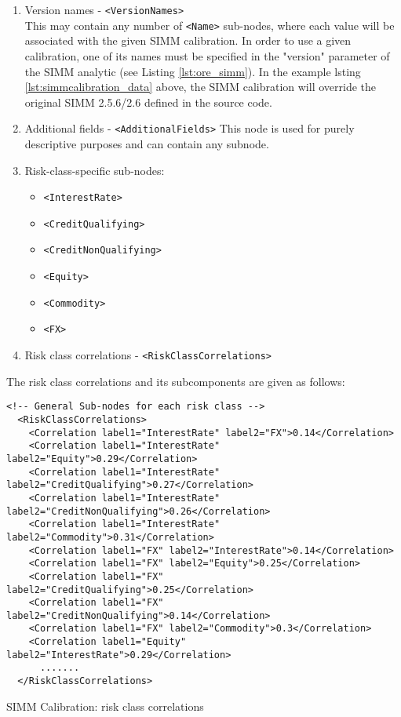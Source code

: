 \begin{enumerate}
  \item Version names - {\tt <VersionNames>} \\
    This may contain any number of {\tt <Name>} sub-nodes, where each value will be associated with the given SIMM
    calibration. In order to use a given calibration, one of its names must be specified in the "version" parameter of the
    SIMM analytic (see Listing \ref{lst:ore_simm}). In the example lsting \ref{lst:simmcalibration_data} above, the SIMM
    calibration will override the original SIMM 2.5.6/2.6 defined in the source code.
  \item Additional fields - {\tt <AdditionalFields>}
    This node is used for purely descriptive purposes and can contain any subnode.
  \item Risk-class-specific sub-nodes:
    \begin{itemize}
      \item {\tt <InterestRate>}
      \item {\tt <CreditQualifying>}
      \item {\tt <CreditNonQualifying>}
      \item {\tt <Equity>}
      \item {\tt <Commodity>}
      \item {\tt <FX>}
    \end{itemize}
  \item Risk class correlations - {\tt <RiskClassCorrelations>}
\end{enumerate}

The risk class correlations and its subcomponents are given as follows:

\begin{listing}[H]
\begin{verbatim}
<!-- General Sub-nodes for each risk class -->
  <RiskClassCorrelations>
    <Correlation label1="InterestRate" label2="FX">0.14</Correlation>
    <Correlation label1="InterestRate" label2="Equity">0.29</Correlation>
    <Correlation label1="InterestRate" label2="CreditQualifying">0.27</Correlation>
    <Correlation label1="InterestRate" label2="CreditNonQualifying">0.26</Correlation>
    <Correlation label1="InterestRate" label2="Commodity">0.31</Correlation>
    <Correlation label1="FX" label2="InterestRate">0.14</Correlation>
    <Correlation label1="FX" label2="Equity">0.25</Correlation>
    <Correlation label1="FX" label2="CreditQualifying">0.25</Correlation>
    <Correlation label1="FX" label2="CreditNonQualifying">0.14</Correlation>
    <Correlation label1="FX" label2="Commodity">0.3</Correlation>
    <Correlation label1="Equity" label2="InterestRate">0.29</Correlation>
      .......
  </RiskClassCorrelations>
\end{verbatim}
\caption{SIMM Calibration: risk class correlations}
\label{lst:simmcalibration_risk_class_correlations}
\end{listing}

